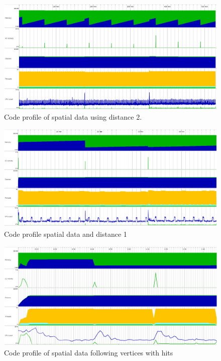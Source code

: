 \begin{figure}
	\centering
	\includegraphics[scale=0.25]{figs/profile2.png}
	\caption{Code profile of spatial data using distance 2.}
	\label{fig:profile2}
\end{figure}
%
\begin{figure}
	\centering
	\includegraphics[scale=0.245]{figs/profile1.png}
	\caption{Code profile spatial data and distance 1}
	\label{fig:profile1}
\end{figure}
%
\begin{figure}
	\centering
	\includegraphics[scale=0.245]{figs/profileHits.png}
	\caption{Code profile of spatial data following vertices with hits}
	\label{fig:profileFollow}
\end{figure}

